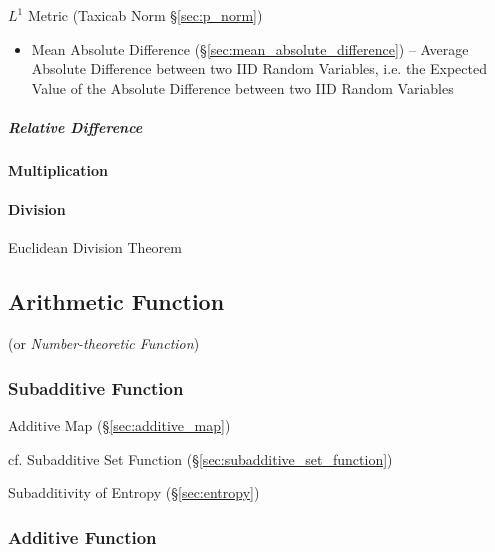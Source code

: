 
$L^1$ Metric (Taxicab Norm \S\ref{sec:p_norm})

\begin{itemize}
  \item Mean Absolute Difference (\S\ref{sec:mean_absolute_difference}) --
    Average Absolute Difference between two IID Random Variables, i.e. the
    Expected Value of the Absolute Difference between two IID Random Variables
\end{itemize}



\subparagraph{Relative Difference}\label{sec:relative_difference}\hfill




\paragraph{Multiplication}\label{sec:addition}\hfill

\paragraph{Division}\label{sec:addition}\hfill

Euclidean Division Theorem



\subsection{Arithmetic Function}\label{sec:arithmetic_function}

(or \emph{Number-theoretic Function})



\subsubsection{Subadditive Function}\label{sec:subadditive_function}

Additive Map (\S\ref{sec:additive_map})

cf. Subadditive Set Function (\S\ref{sec:subadditive_set_function})

Subadditivity of Entropy (\S\ref{sec:entropy})



\subsubsection{Additive Function}\label{sec:additive_function}

